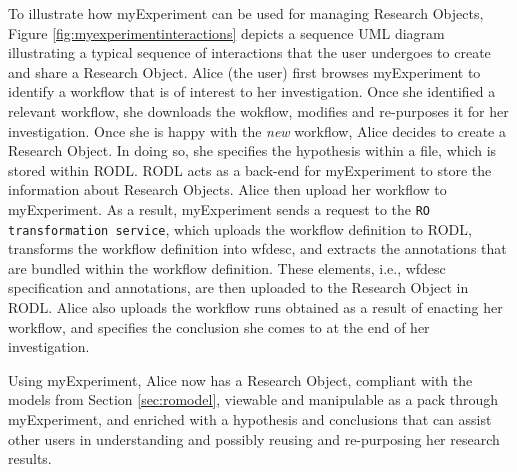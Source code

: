 To illustrate how myExperiment can be used for managing Research Objects, Figure \ref{fig:myexperimentinteractions} depicts a sequence UML diagram illustrating a typical sequence of interactions that the user undergoes to create and share a Research Object. Alice (the user) first browses myExperiment to identify a workflow that is of interest to her investigation. Once she identified a relevant workflow, she downloads the wokflow, modifies and re-purposes it for her investigation. Once she is happy with the \emph{new} workflow, Alice decides to create a Research Object. In doing so, she specifies the hypothesis within a file, which is stored within RODL. RODL acts as a back-end for myExperiment to store the information about Research Objects. Alice then upload her workflow to myExperiment. As a result, myExperiment sends a request to the \texttt{RO transformation service}, which uploads the workflow definition to RODL, transforms the workflow definition into wfdesc, and extracts the annotations that are bundled within the workflow definition. These elements, i.e., wfdesc specification and annotations, are then uploaded to the Research Object in RODL. Alice also uploads the workflow runs obtained as a result of enacting her workflow, and specifies the conclusion she comes to at the end of her investigation. 

Using myExperiment, Alice now has a Research Object, compliant with the models from Section \ref{sec:romodel}, viewable and manipulable as a pack through myExperiment, and enriched with a hypothesis and conclusions that can assist other users in understanding and possibly reusing and re-purposing her research results.
